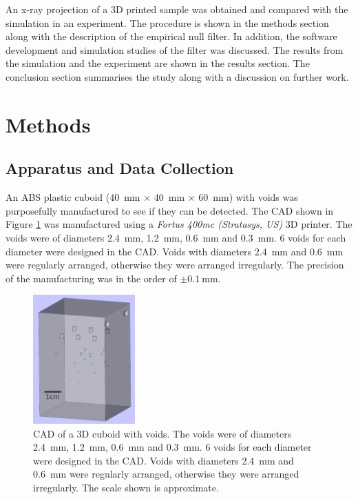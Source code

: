 \documentclass{proc}
\begin{document}
An x-ray projection of a 3D printed sample was obtained and compared with the simulation in an experiment. The procedure is shown in the methods section along with the description of the empirical null filter. In addition, the software development and simulation studies of the filter was discussed. The results from the simulation and the experiment are shown in the results section. The conclusion section summarises the study along with a discussion on further work.

\section{Methods}

\subsection{Apparatus and Data Collection}

An ABS plastic cuboid (\SI{40}{\milli\metre} $\times$ \SI{40}{\milli\metre} $\times$ \SI{60}{\milli\metre}) with voids was purposefully manufactured to see if they can be detected. The CAD shown in Figure \ref{fig:inference_testObject} was manufactured using a \emph{Fortus 400mc (Stratasys, US)} 3D printer. The voids were of diameters \SI{2.4}{\milli\metre}, \SI{1.2}{\milli\metre}, \SI{0.6}{\milli\metre} and \SI{0.3}{\milli\metre}. 6 voids for each diameter were designed in the CAD. Voids with diameters \SI{2.4}{\milli\metre} and \SI{0.6}{\milli\metre} were regularly arranged, otherwise they were arranged irregularly. The precision of the manufacturing was in the order of $\pm\SI{0.1}{\milli\metre}$.

\begin{figure}
  \centering
  \includegraphics[width=0.35\textwidth]{../figures/inference/TestObject.png}
  \caption{CAD of a 3D cuboid with voids. The voids were of diameters \SI{2.4}{\milli\metre}, \SI{1.2}{\milli\metre}, \SI{0.6}{\milli\metre} and \SI{0.3}{\milli\metre}. 6 voids for each diameter were designed in the CAD. Voids with diameters \SI{2.4}{\milli\metre} and \SI{0.6}{\milli\metre} were regularly arranged, otherwise they were arranged irregularly. The scale shown is approximate.}
  \label{fig:inference_testObject}
\end{figure}
\end{document}

